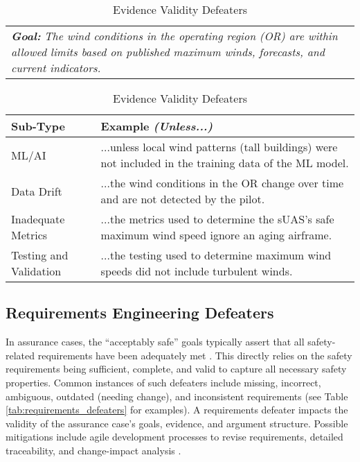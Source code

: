 \begin{table}[t]
\centering
\caption{Evidence Validity Defeaters}
\begin{tabularx}{\linewidth}{ @{} X }
\toprule
\textit{\textbf{Goal:}} \textit{The wind conditions in the operating region (OR) are within allowed limits based on published maximum winds, forecasts, and current indicators.} \\
\end{tabularx}

\begin{tabularx}{\linewidth}{@{} l X }
\toprule
\textbf{Sub-Type} & \textbf{Example \textit{(Unless...)}} \\
\midrule
ML/AI & ...unless local wind patterns (tall buildings) were not included in the training data of the ML model.\\
Data Drift & ...the wind conditions in the OR change over time and are not detected by the pilot.\\
Inadequate Metrics & ...the metrics used to determine the sUAS's safe maximum wind speed ignore an aging airframe.\\
Testing and Validation & ...the testing used to determine maximum wind speeds did not include turbulent winds.\\
\bottomrule
\end{tabularx}
\label{tab:evidence_integrity_defeaters}
\end{table}

\subsection{Requirements Engineering Defeaters}

In assurance cases, the ``acceptably safe” goals typically assert that all safety-related requirements have been adequately met \cite{bloomfield2021safety}. This directly relies on the safety requirements being sufficient, complete, and valid to capture all necessary safety properties. Common instances of such defeaters include missing, incorrect, ambiguous, outdated (needing change), and inconsistent requirements (see Table \ref{tab:requirements_defeaters} for examples). A requirements defeater impacts the validity of the assurance case's goals, evidence, and argument structure. Possible mitigations include agile development processes to revise requirements, detailed traceability, and change-impact analysis \cite{lams09, bloomfield2021safety}.

